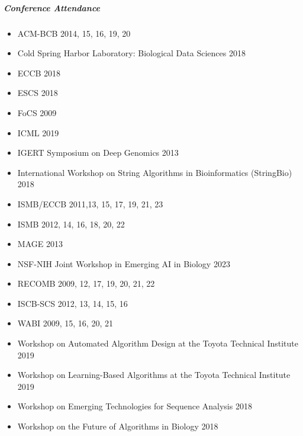 \documentclass[10pt,letterpaper]{article}
\begin{document}
\subparagraph{Conference Attendance}
\begin{itemize}
	\item ACM-BCB 2014, 15, 16, 19, 20
	\item Cold Spring Harbor Laboratory: Biological Data Sciences 2018
	\item ECCB 2018
	\item ESCS 2018
	\item FoCS 2009
	\item ICML 2019
	\item IGERT Symposium on Deep Genomics 2013
	\item International Workshop on String Algorithms in Bioinformatics (StringBio) 2018
	\item ISMB/ECCB 2011,13, 15, 17, 19, 21, 23
	\item ISMB 2012, 14, 16, 18, 20, 22
	\item MAGE 2013
	\item NSF-NIH Joint Workshop in Emerging AI in Biology 2023
	\item RECOMB 2009, 12, 17, 19, 20, 21, 22
	\item ISCB-SCS 2012, 13, 14, 15, 16
	\item WABI 2009, 15, 16, 20, 21
	\item Workshop on Automated Algorithm Design at the Toyota Technical Institute 2019
	\item Workshop on Learning-Based Algorithms at the Toyota Technical Institute 2019
	\item Workshop on Emerging Technologies for Sequence Analysis 2018
	\item Workshop on the Future of Algorithms in Biology 2018
\end{itemize}
\end{document}
